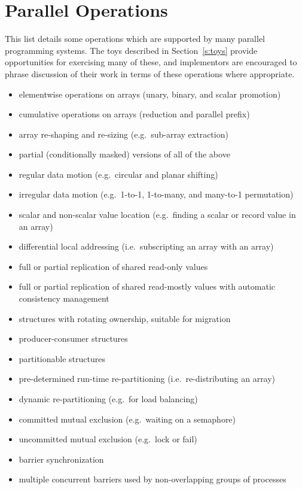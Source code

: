 \section{Parallel Operations\label{s:ops}}

This list details some operations which are supported by many parallel programming systems.
The toys described in Section~\ref{s:toys} provide opportunities for exercising many of these,
and implementors are encouraged to phrase discussion of their work in terms of these operations where appropriate.

\begin{itemize}
\item	elementwise operations on arrays (unary, binary, and scalar promotion)
\item	cumulative operations on arrays (reduction and parallel prefix)
\item	array re-shaping and re-sizing (e.g.\ sub-array extraction)
\item	partial (conditionally masked) versions of all of the above
\item	regular data motion (e.g.\ circular and planar shifting)
\item	irregular data motion (e.g.\ 1-to-1, 1-to-many, and many-to-1 permutation)
\item	scalar and non-scalar value location (e.g.\ finding a scalar or record value in an array)
\item	differential local addressing (i.e.\ subscripting an array with an array)
\item	full or partial replication of shared read-only values
\item	full or partial replication of shared read-mostly values with automatic consistency management
\item	structures with rotating ownership, suitable for migration
\item	producer-consumer structures
\item	partitionable structures
\item	pre-determined run-time re-partitioning (i.e.\ re-distributing an array)
\item	dynamic re-partitioning (e.g.\ for load balancing)
\item	committed mutual exclusion (e.g.\ waiting on a semaphore)
\item	uncommitted mutual exclusion (e.g.\ lock or fail)
\item	barrier synchronization
\item	multiple concurrent barriers used by non-overlapping groups of processes

\end{itemize}
